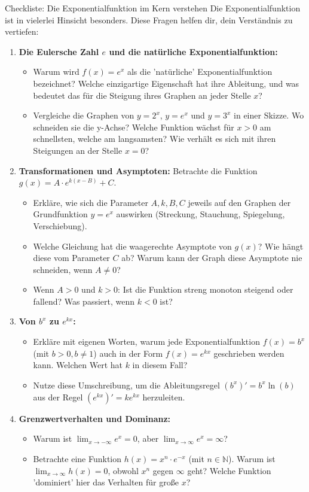 \begin{aufgabenumgebung}{Checkliste: Die Exponentialfunktion im Kern verstehen}
Die Exponentialfunktion ist in vielerlei Hinsicht besonders. Diese Fragen helfen dir, dein Verständnis zu vertiefen:

\begin{enumerate}[label=(\alph*)]
    \item \textbf{Die Eulersche Zahl $e$ und die natürliche Exponentialfunktion:}
    \begin{itemize}
        \item Warum wird $f(x)=e^x$ als die 'natürliche' Exponentialfunktion bezeichnet? Welche einzigartige Eigenschaft hat ihre Ableitung, und was bedeutet das für die Steigung ihres Graphen an jeder Stelle $x$?
        \item Vergleiche die Graphen von $y=2^x$, $y=e^x$ und $y=3^x$ in einer Skizze. Wo schneiden sie die y-Achse? Welche Funktion wächst für $x>0$ am schnellsten, welche am langsamsten? Wie verhält es sich mit ihren Steigungen an der Stelle $x=0$?
    \end{itemize}
    \item \textbf{Transformationen und Asymptoten:}
    Betrachte die Funktion $g(x) = A \cdot e^{k(x-B)} + C$.
    \begin{itemize}
        \item Erkläre, wie sich die Parameter $A, k, B, C$ jeweils auf den Graphen der Grundfunktion $y=e^x$ auswirken (Streckung, Stauchung, Spiegelung, Verschiebung).
        \item Welche Gleichung hat die waagerechte Asymptote von $g(x)$? Wie hängt diese vom Parameter $C$ ab? Warum kann der Graph diese Asymptote nie schneiden, wenn $A \neq 0$?
        \item Wenn $A>0$ und $k>0$: Ist die Funktion streng monoton steigend oder fallend? Was passiert, wenn $k<0$ ist?
    \end{itemize}
    \item \textbf{Von $b^x$ zu $e^{kx}$:}
    \begin{itemize}
        \item Erkläre mit eigenen Worten, warum jede Exponentialfunktion $f(x)=b^x$ (mit $b>0, b\neq1$) auch in der Form $f(x)=e^{kx}$ geschrieben werden kann. Welchen Wert hat $k$ in diesem Fall?
        \item Nutze diese Umschreibung, um die Ableitungsregel $(b^x)' = b^x \ln(b)$ aus der Regel $(e^{kx})' = k e^{kx}$ herzuleiten.
    \end{itemize}
    \item \textbf{Grenzwertverhalten und Dominanz:}
    \begin{itemize}
        \item Warum ist $\lim_{x \to -\infty} e^x = 0$, aber $\lim_{x \to \infty} e^x = \infty$?
        \item Betrachte eine Funktion $h(x) = x^n \cdot e^{-x}$ (mit $n \in \mathbb{N}$). Warum ist $\lim_{x \to \infty} h(x) = 0$, obwohl $x^n$ gegen $\infty$ geht? Welche Funktion 'dominiert' hier das Verhalten für große $x$?
    \end{itemize}
\end{enumerate}
\end{aufgabenumgebung}

